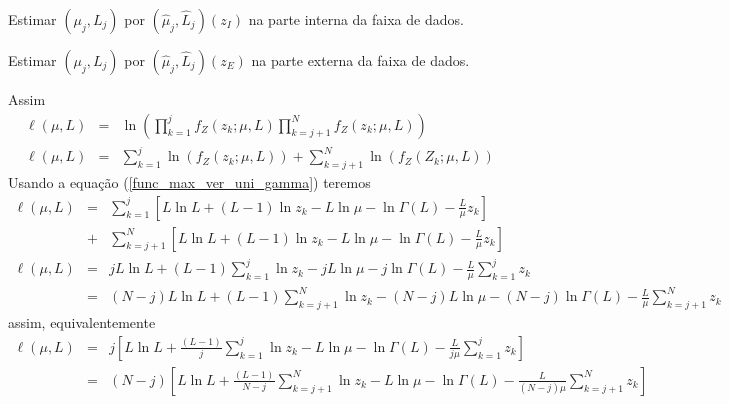\documentclass[journal,article,submit,moreauthors,pdftex]{Definitions/mdpi}
\begin{document}
Estimar $(\mu_j, L_j )$ por $(\hat{\mu}_j, \hat{L}_j)(z_I)$ na parte interna da faixa de dados.

Estimar $(\mu_j, L_j )$ por $(\hat{\mu}_j, \hat{L}_j)(z_E)$ na parte externa da faixa de dados.


Assim
\begin{equation}\label{cap_acf_16}
\begin{array}{ccc}
 \ell(\mu, L)&=&\ln\left(\prod_{k=1}^{j}f_{Z}(z_k;\mu,L)\prod_{k=j+1}^{N}f_{Z}(z_k;\mu,L)\right)\\
 \ell(\mu, L)&=&\sum_{k=1}^{j}\ln\left(f_{Z}(z_k;\mu,L)\right)+\sum_{k=j+1}^{N}\ln\left(f_{Z}(Z_k;\mu,L)\right)
 \end{array}
 \end{equation}
Usando a equação (\ref{func_max_ver_uni_gamma}) teremos
\begin{equation}\nonumber
\begin{array}{ccc}
  \ell(\mu, L)&=&\sum_{k=1}^{j}\left[L\ln L +(L - 1) \ln z_k-L \ln \mu-\ln \Gamma(L) -\frac{L}{\mu} z_k\right]\\
              &+&\sum_{k=j+1}^{N}\left[L\ln L +(L - 1) \ln z_k-L \ln \mu-\ln \Gamma(L) -\frac{L}{\mu} z_k\right]\\
  \ell(\mu, L)&=&jL\ln L+(L-1)\sum_{k=1}^{j}\ln z_k-jL\ln\mu-j\ln\Gamma(L) -\frac{L}{\mu}\sum_{k=1}^{j} z_k\\
              &=&(N-j)L\ln L+(L-1)\sum_{k=j+1}^{N}\ln z_k-(N-j)L\ln\mu-(N-j)\ln\Gamma(L) -\frac{L}{\mu}\sum_{k=j+1}^{N} z_k
 \end{array}
 \end{equation}
assim, equivalentemente 
 \begin{equation}\nonumber
\begin{array}{ccc}  
  \ell(\mu, L)&=&j\left[L\ln L+\frac{(L-1)}{j}\sum_{k=1}^{j}\ln z_k-L\ln\mu-\ln\Gamma(L) -\frac{L}{j\mu}\sum_{k=1}^{j} z_k\right]\\
              &=&(N-j)\left[L\ln L+\frac{(L-1)}{N-j}\sum_{k=j+1}^{N}\ln z_k-L\ln\mu-\ln\Gamma(L) -\frac{L}{(N-j)\mu}\sum_{k=j+1}^{N} z_k\right]
 \end{array}
 \end{equation}
\end{document}
